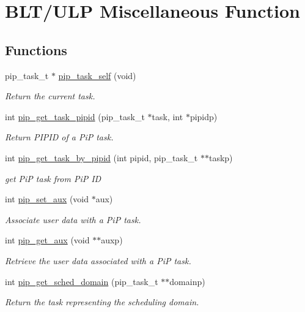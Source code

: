 \hypertarget{group__ULP-3-misc}{\section{B\-L\-T/\-U\-L\-P Miscellaneous Function}
\label{group__ULP-3-misc}
}
\subsection*{Functions}
\begin{DoxyCompactItemize}
\item 
pip\-\_\-task\-\_\-t $\ast$ \hyperlink{group__ULP-3-misc_gaf09a1abfd580696c74d4aa7be8255ad0}{pip\-\_\-task\-\_\-self} (void)
\begin{DoxyCompactList}\small\item\em Return the current task. \end{DoxyCompactList}\item 
int \hyperlink{group__ULP-3-misc_ga14a1b03ec6564885a5dd97dbc27167aa}{pip\-\_\-get\-\_\-task\-\_\-pipid} (pip\-\_\-task\-\_\-t $\ast$task, int $\ast$pipidp)
\begin{DoxyCompactList}\small\item\em Return P\-I\-P\-I\-D of a Pi\-P task. \end{DoxyCompactList}\item 
int \hyperlink{group__ULP-3-misc_ga147decca4226959d822b73b7c31a4465}{pip\-\_\-get\-\_\-task\-\_\-by\-\_\-pipid} (int pipid, pip\-\_\-task\-\_\-t $\ast$$\ast$taskp)
\begin{DoxyCompactList}\small\item\em get Pi\-P task from Pi\-P I\-D \end{DoxyCompactList}\item 
int \hyperlink{group__ULP-3-misc_gabe36293dba51fe90f94057bb4f82f328}{pip\-\_\-set\-\_\-aux} (void $\ast$aux)
\begin{DoxyCompactList}\small\item\em Associate user data with a Pi\-P task. \end{DoxyCompactList}\item 
int \hyperlink{group__ULP-3-misc_ga779abad7e346657a6fd3c024e204addb}{pip\-\_\-get\-\_\-aux} (void $\ast$$\ast$auxp)
\begin{DoxyCompactList}\small\item\em Retrieve the user data associated with a Pi\-P task. \end{DoxyCompactList}\item 
int \hyperlink{group__ULP-3-misc_ga32119e3a41a4073b52ade76bf87a5589}{pip\-\_\-get\-\_\-sched\-\_\-domain} (pip\-\_\-task\-\_\-t $\ast$$\ast$domainp)
\begin{DoxyCompactList}\small\item\em Return the task representing the scheduling domain. \end{DoxyCompactList}\end{DoxyCompactItemize}


